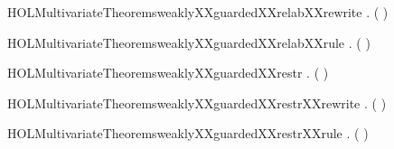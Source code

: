 \newcommand{\HOLMultivariateTheoremsweaklyXXguardedXXrelab}{\UseVerbatim{HOLMultivariateTheoremsweaklyXXguardedXXrelab}}
\begin{SaveVerbatim}{HOLMultivariateTheoremsweaklyXXguardedXXrelabXXrewrite}
\HOLTokenTurnstile{} \HOLSymConst{\HOLTokenForall{}}  .
         (  ) \HOLSymConst{\HOLTokenEquiv{}}   
\end{SaveVerbatim}
\newcommand{\HOLMultivariateTheoremsweaklyXXguardedXXrelabXXrewrite}{\UseVerbatim{HOLMultivariateTheoremsweaklyXXguardedXXrelabXXrewrite}}
\begin{SaveVerbatim}{HOLMultivariateTheoremsweaklyXXguardedXXrelabXXrule}
\HOLTokenTurnstile{} \HOLSymConst{\HOLTokenForall{}}  .
          \HOLSymConst{\HOLTokenImp{}}   (  )
\end{SaveVerbatim}
\newcommand{\HOLMultivariateTheoremsweaklyXXguardedXXrelabXXrule}{\UseVerbatim{HOLMultivariateTheoremsweaklyXXguardedXXrelabXXrule}}
\begin{SaveVerbatim}{HOLMultivariateTheoremsweaklyXXguardedXXrestr}
\HOLTokenTurnstile{} \HOLSymConst{\HOLTokenForall{}}  .   (\HOLConst{\ensuremath{\nu}}  ) \HOLSymConst{\HOLTokenImp{}}   
\end{SaveVerbatim}
\newcommand{\HOLMultivariateTheoremsweaklyXXguardedXXrestr}{\UseVerbatim{HOLMultivariateTheoremsweaklyXXguardedXXrestr}}
\begin{SaveVerbatim}{HOLMultivariateTheoremsweaklyXXguardedXXrestrXXrewrite}
\HOLTokenTurnstile{} \HOLSymConst{\HOLTokenForall{}}  .   (\HOLConst{\ensuremath{\nu}}  ) \HOLSymConst{\HOLTokenEquiv{}}   
\end{SaveVerbatim}
\newcommand{\HOLMultivariateTheoremsweaklyXXguardedXXrestrXXrewrite}{\UseVerbatim{HOLMultivariateTheoremsweaklyXXguardedXXrestrXXrewrite}}
\begin{SaveVerbatim}{HOLMultivariateTheoremsweaklyXXguardedXXrestrXXrule}
\HOLTokenTurnstile{} \HOLSymConst{\HOLTokenForall{}}  .    \HOLSymConst{\HOLTokenImp{}}   (\HOLConst{\ensuremath{\nu}}  )
\end{SaveVerbatim}
